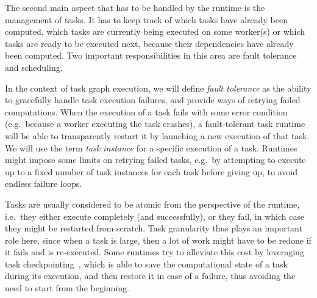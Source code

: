 The second main aspect that has to be handled by the runtime is the management of tasks. It has to
keep track of which tasks have already been computed, which tasks are currently being executed on
some worker(s) or which tasks are ready to be executed next, because their dependencies have
already been computed. Two important responsibilities in this area are fault tolerance and
scheduling.

In the context of task graph execution, we will define \emph{fault tolerance} as the ability to
gracefully handle task execution failures, and provide ways of retrying failed computations. When
the execution of a task fails with some error condition (e.g.\ because a worker executing the task
crashes), a fault-tolerant task runtime will be able to transparently restart it by launching a new
execution of that task. We will use the term \emph{task instance} for a specific execution of a
task. Runtimes might impose some limits on retrying failed tasks, e.g.\ by attempting to execute up
to a fixed number of task instances for each task before giving up, to avoid endless failure loops.

Tasks are usually considered to be atomic from the perspective of the runtime, i.e.\ they either
execute completely (and successfully), or they fail, in which case they might be restarted from
scratch. Task granularity thus plays an important role here, since when a task is large, then a lot
of work might have to be redone if it fails and is re-executed. Some runtimes try to alleviate this
cost by leveraging task checkpointing~\cite{task_checkpointing}, which is able to save the
computational state of a task during its execution, and then restore it in case of a failure, thus
avoiding the need to start from the beginning.

%

